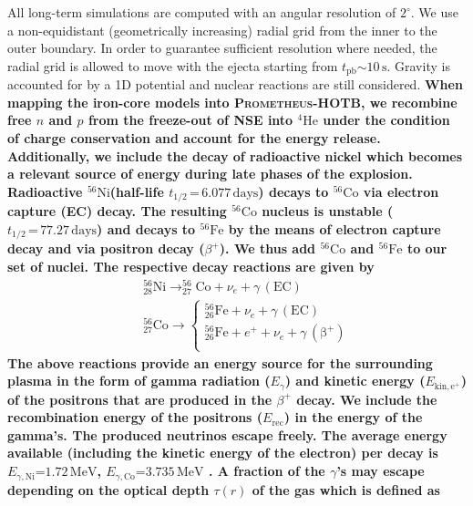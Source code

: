 \documentclass[fleqn,usenatbib]{mnras}
\newcommand{\tpb}{\ensuremath{t_{\text{pb}}}}
\newcommand{\helium}{\ensuremath{\mathrm{^{4}He}}\xspace}
\newcommand{\nickel}{\ensuremath{\mathrm{^{56}Ni}}\xspace}
\newcommand{\iron}{\ensuremath{\mathrm{^{56}Fe}}\xspace}
\newcommand{\cobalt}{\ensuremath{\mathrm{^{56}Co}}\xspace}
\newcommand{\s}{\ensuremath{\text{s}}}
\newcommand{\prom}{\textsc{Prometheus-HOTB}\xspace}
\begin{document}
All long-term simulations are computed with an angular resolution of $2^{\circ}$. We use a non-equidistant (geometrically increasing) radial grid from the inner to the outer boundary. In order to guarantee sufficient resolution where needed, the radial grid is allowed to move with the ejecta starting from $\tpb\mathord{\sim}10\,\s$. 
Gravity is accounted for by a 1D potential and nuclear reactions are still considered. 
\textbf{
When mapping the iron-core models into \prom, we recombine free $n$ and $p$ from the freeze-out of NSE into \helium under the condition of charge conservation and account for the energy release. } 
\textbf{
Additionally, we include the decay of radioactive nickel which becomes a relevant source of energy during late phases of the explosion.
Radioactive \nickel (half-life $t_{1/2}\,\mathord{=}\,  6.077\, \mathrm{days}$) decays to \cobalt via electron capture (EC) decay. The resulting \cobalt nucleus is unstable ($t_{1/2}\,\mathord{=}\, 77.27\, \mathrm{days}$) and decays to \iron by the means of electron capture decay and via positron decay ($\beta^+$). We thus add \cobalt and \iron to our set of nuclei.
The respective decay reactions are given by
\begin{eqnarray}
   && _{28}^{56}\mathrm{Ni} \rightarrow _{27}^{56}\mathrm{Co} + \nu_e + \gamma\, (\mathrm{EC}) \nonumber \\
   && _{27}^{56}\mathrm{Co} \rightarrow \begin{cases}
                                                        _{26}^{56}\mathrm{Fe} + \nu_e + \gamma \, (\mathrm{EC})\\
                                                        _{26}^{56}\mathrm{Fe} + e^+ + \nu_e + \gamma\, (\mathrm{\beta^+})\\
                                          \end{cases}
\end{eqnarray}
The above reactions provide an energy source for the surrounding plasma in the form of gamma radiation ($E_{\gamma}$) and kinetic energy ($E_{\mathrm{kin,e^{+}}}$) of the positrons that are produced in the $\beta^+$ decay. We include the recombination energy of the positrons ($E_{\mathrm{rec}}$) in the energy of the gamma's. The produced neutrinos escape freely.
The average energy available (including the kinetic energy of the electron) per decay is $E_{\gamma,\mathrm{Ni}}\mathord{=}1.72\,\mathrm{MeV}$, $E_{\gamma,\mathrm{Co}}\mathord{=}3.735\,\mathrm{MeV}$ \cite{Nadyozhin1994}.
A fraction of the $\gamma$'s may escape depending on the optical depth $\tau(r)$ of the gas which is defined as
}
\end{document}
